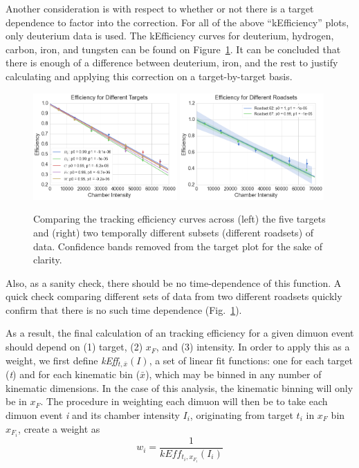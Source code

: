 Another consideration is with respect to whether or not there is a target dependence to factor into the correction. For all of the above ``kEfficiency'' plots, only deuterium data is used. The kEfficiency curves for deuterium, hydrogen, carbon, iron, and tungsten can be found on Figure~\ref{fig:keff-target-roadset}. It can be concluded that there is enough of a difference between deuterium, iron, and the rest to justify calculating and applying this correction on a target-by-target basis.
\begin{figure}
	\centering
	\includegraphics[width=0.49\textwidth]{figures/analysis/target-keff-int.png}
	\includegraphics[width=0.49\textwidth]{figures/analysis/roadset-keff-int.png}
	\caption{Comparing the tracking efficiency curves across (left) the five targets and (right) two temporally different subsets (different roadsets) of data. Confidence bands removed from the target plot for the sake of clarity.}
	\label{fig:keff-target-roadset}
\end{figure}

Also, as a sanity check, there should be no time-dependence of this function. A quick check comparing different sets of data from two different roadsets quickly confirm that there is no such time dependence (Fig.~\ref{fig:keff-target-roadset}).

As a result, the final calculation of an tracking efficiency for a given dimuon event should depend on (1) target, (2) $x_F$, and (3) intensity. In order to apply this as a weight, we first define \emph{kEff}$_{t, \bar{x}}(I)$, a set of linear fit functions: one for each target (\emph{t}) and for each kinematic bin ($\bar{x}$), which may be binned in any number of kinematic dimensions. In the case of this analysis, the kinematic binning will only be in $x_F$. The procedure in weighting each dimuon will then be to take each dimuon event \emph{i} and its chamber intensity $I_i$, originating from target $t_i$ in $x_F$ bin $x_{F_i}$, create a weight as
\begin{equation}
w_i = \frac{1}{kEff_{t_i, x_{F_i}}(I_i)}
\end{equation}


